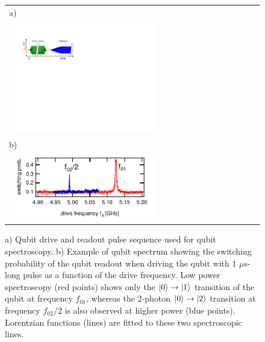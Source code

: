 \begin{figure}[ht!]
\begin{center}
\begin{tabular}{l}
a) \\ \includegraphics[width=0.6\textwidth]{"./material/figures/measurement/qubit_spectroscopy"} \\
b) \\ \includegraphics[width=0.6\textwidth]{"./data/ct5/2011_04_21 - grover and tomo/example - qubit 2 spectroscopy"} \\
\end{tabular}
\end{center}
\caption[]{a) Qubit drive and readout pulse sequence used for qubit spectroscopy. b) Example of qubit spectrum showing the switching probability of the qubit readout when driving the qubit with 1 $\mu$s-long pulse as a function of the drive frequency. Low power spectroscopy (red points) shows only the $\left| 0 \right>\to\left| 1 \right>$ transition of the qubit at frequency $f_{01}$, whereas the 2-photon $\left| 0 \right>\to\left| 2 \right>$ transition at frequency $f_{02}/2$ is also observed at higher power (blue points). Lorentzian functions (lines) are fitted to these two spectroscopic lines.}
\label{fig:qubit_spectroscopy_example}
\end{figure}

